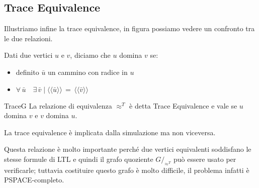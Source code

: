\subsection{Trace Equivalence}
Illustriamo infine la trace equivalence, in figura possiamo vedere un confronto tra le due relazioni.
\begin{definition}
Dati due vertici $u$ e $v$, diciamo che $u$ domina $v$ se:
\begin{itemize}
\item definito $\bar{u}$ un cammino con radice in $u$
\item $\forall\,\bar{u}\quad\exists\,\bar{v}\;|\;\langle\langle \bar{u} \rangle\rangle\,=\, \langle\langle \bar{v} \rangle\rangle$
\end{itemize}TraceG
La relazione di equivalenza $\approx^T$ è detta Trace Equivalence e vale se $u$ domina $v$ e $v$ domina $u$.
\end{definition}
\begin{lemma}
La trace equivalence è implicata dalla simulazione ma non viceversa.
\end{lemma}
Questa relazione è molto importante perché due vertici equivalenti soddisfano le stesse formule di LTL e quindi il grafo quoziente $G/_{\approx^T}$ può essere usato per verificarle; tuttavia costituire questo grafo è molto difficile, il problema infatti è PSPACE-completo.\\\\
\newpage
